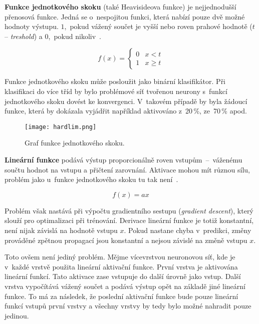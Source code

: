 \textbf{Funkce jednotkového skoku} (také Heavisideova funkce) je nejjednodušší přenosová funkce. Jedná se o~nespojitou funkci, která nabízí pouze dvě možné hodnoty výstupu. $1$,~pokud vážený součet je vyšší nebo roven prahové hodnotě ($t$ -- \textit{treshold}) a $0$,~pokud nikoliv~\cite{mediumActivationFunctions}.

\begin{equation}
    f(x)=\left\{\begin{matrix}
        0 & x < t \\
        1 & x \geq t
    \end{matrix}\right.
\end{equation}

Funkce jednotkového skoku může posloužit jako binární klasifikátor. Při klasifikaci do více tříd by bylo problémové síť tvořenou neurony s~funkcí jednotkového skoku dovést ke konvergenci. V~takovém případě by byla žádoucí funkce, která by dokázala vyjádřit například aktivováno z~20\,\%, ze~70\,\% apod.

\begin{figure}[H]
    \centering
    \texttt{[image: hardlim.png]}
    \caption[Graf funkce jednotkového skoku]{Graf funkce jednotkového skoku.}
    \label{fig_hardlim}
\end{figure}


\textbf{Lineární funkce} podává výstup proporcionálně roven vstupům~--~váženému součtu hodnot na vstupu a přičtení zarovnání. Aktivace mohou mít různou sílu, problém jako u~funkce jednotkového skoku tu tak není~\cite{mediumActivationFunctions}.

\begin{equation}
    f(x)=ax
\end{equation}

Problém však nastává při výpočtu gradientního sestupu (\textit{gradient descent}), který slouží pro optimalizaci při trénování. Derivace lineární funkce je totiž konstantní, není nijak závislá na hodnotě vstupu $x$. Pokud nastane chyba v~predikci, změny prováděné zpětnou propagací jsou konstantní a nejsou závislé na změně vstupu $x$.

Toto ovšem není jediný problém. Mějme vícevrstvou neuronovou síť, kde je v~každé vrstvě použita lineární aktivační funkce. První vrstva je aktivována lineární funkcí. Tato aktivace zase vstupuje do další úrovně jako vstup. Další vrstva vypočítává vážený součet a podává výstup opět na základě jiné lineární funkce. To má za následek, že poslední aktivační funkce bude pouze lineární funkcí vstupů první vrstvy a všechny vrstvy by tedy bylo možné nahradit pouze jedinou.

